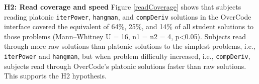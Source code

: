 {\bf H2: Read coverage and speed} Figure \ref{readCoverage} shows that subjects reading platonic \texttt{iterPower}, \texttt{hangman}, and \texttt{compDeriv} solutions in the OverCode interface covered the equivalent of 64\%, 25\%, and 14\% of all student solutions to those problems (Mann--Whitney U = 16, n1 = n2 = 4, p<0.05). Subjects read through more raw solutions than platonic solutions to the simplest problems, i.e., \texttt{iterPower} and \texttt{hangman}, but when problem difficulty increased, i.e., \texttt{compDeriv}, subjects read through OverCode's platonic solutions faster than raw solutions. This supports the H2 hypothesis.


